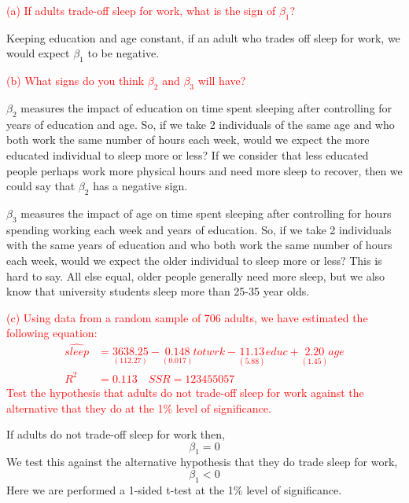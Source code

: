 \documentclass[12pt]{report}
\begin{document}
\noindent \textcolor{red}{(a) If adults trade-off sleep for work, what is the sign of $\beta_1$?}

\noindent Keeping education and age constant, if an adult who trades off sleep for work, we would expect $\beta_1$ to be negative.

\noindent \textcolor{red}{(b) What signs do you think $\beta_2$ and $\beta_3$ will have?}

\noindent $\beta_2$ measures the impact of education on time spent sleeping after controlling for years of education and age. So, if we take 2 individuals of the same age and who both work the same number of hours each week, would we expect the more educated individual to sleep more or less? If we consider that less educated people perhaps work more physical hours and need more sleep to recover, then we could say that $\beta_2$ has a negative sign.

\noindent $\beta_3$ measures the impact of age on time spent sleeping after controlling for hours spending working each week and years of education. So, if we take 2 individuals with the same years of education and who both work the same number of hours each week, would we expect the older individual to sleep more or less? This is hard to say. All else equal, older people generally need more sleep, but we also know that university students sleep more than 25-35 year olds.

\noindent \textcolor{red}{(c) Using data from a random sample of 706 adults, we have estimated the following equation: \begin{align}
	\widehat{sleep} &= \underset{(112.27)}{3638.25} - \underset{(0.017)}{0.148}totwrk - \underset{(5.88)}{11.13}educ + \underset{(1.45)}{2.20}age \\
	R^2 &= 0.113 \quad SSR = 123455057 \nonumber
	\end{align} Test the hypothesis that adults do not trade-off sleep for work against the alternative that they do at the 1\% level of significance.
}

\noindent If adults do not trade-off sleep for work then, $$\beta_1 = 0$$ We test this against the alternative hypothesis that they do trade sleep for work, $$\beta_1 < 0$$ Here we are performed a 1-sided t-test at the 1\% level of significance.
\end{document}
